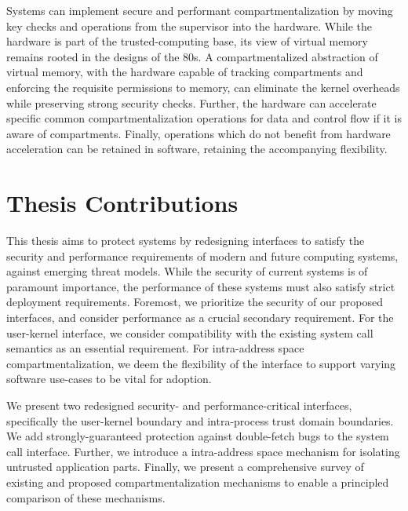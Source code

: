Systems can implement secure and performant compartmentalization by moving
key checks and operations from the supervisor into the hardware.
While the hardware is part of the trusted-computing base, its view of virtual
memory remains rooted in the designs of the 80s.
A compartmentalized abstraction of virtual memory, with the hardware capable
of tracking compartments and enforcing the requisite permissions to memory,
can eliminate the kernel overheads while preserving strong security checks.
Further, the hardware can accelerate specific common compartmentalization
operations for data and control flow if it is aware of compartments.
Finally, operations which do not benefit from hardware acceleration can
be retained in software, retaining the accompanying flexibility.

\section{Thesis Contributions}

This thesis aims to protect systems by redesigning interfaces to satisfy 
the security and performance requirements of modern and future computing 
systems, against emerging threat models.
While the security of current systems is of paramount importance, the
performance of these systems must also satisfy strict deployment 
requirements.
Foremost, we prioritize the security of our proposed interfaces, and
consider performance as a crucial secondary requirement.
For the user-kernel interface, we consider compatibility with
the existing system call semantics as an essential requirement.
For intra-address space compartmentalization, we  deem the flexibility
of the interface to support varying software use-cases to be vital for adoption.

We present two redesigned security- and performance-critical 
interfaces, specifically the user-kernel boundary and 
intra-process trust domain boundaries.
We add strongly-guaranteed protection against double-fetch bugs to
the system call interface.
Further, we introduce a intra-address space mechanism for
isolating untrusted application parts.
Finally, we present a comprehensive survey of existing and proposed
compartmentalization mechanisms to enable a principled comparison
of these mechanisms.

